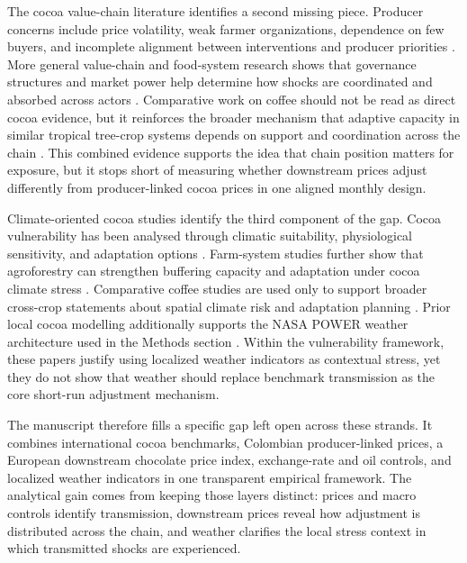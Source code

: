 The cocoa value-chain literature identifies a second missing piece. Producer concerns include price volatility, weak farmer organizations, dependence on few buyers, and incomplete alignment between interventions and producer priorities \citep{Mithofer2017}. More general value-chain and food-system research shows that governance structures and market power help determine how shocks are coordinated and absorbed across actors \citep{Gereffi2005,Merkle2021}. Comparative work on coffee should not be read as direct cocoa evidence, but it reinforces the broader mechanism that adaptive capacity in similar tropical tree-crop systems depends on support and coordination across the chain \citep{Morales2022,Verburg2019}. This combined evidence supports the idea that chain position matters for exposure, but it stops short of measuring whether downstream prices adjust differently from producer-linked cocoa prices in one aligned monthly design.

Climate-oriented cocoa studies identify the third component of the gap. Cocoa vulnerability has been analysed through climatic suitability, physiological sensitivity, and adaptation options \citep{Schroth2016,Laderach2013,Lahive2019}. Farm-system studies further show that agroforestry can strengthen buffering capacity and adaptation under cocoa climate stress \citep{Jacobi2013,Niether2020,Vaast2014}. Comparative coffee studies are used only to support broader cross-crop statements about spatial climate risk and adaptation planning \citep{Koh2020,Laderach2016}. Prior local cocoa modelling additionally supports the NASA POWER weather architecture used in the Methods section \citep{talero_sarmiento_etal_2025}. Within the vulnerability framework, these papers justify using localized weather indicators as contextual stress, yet they do not show that weather should replace benchmark transmission as the core short-run adjustment mechanism.

The manuscript therefore fills a specific gap left open across these strands. It combines international cocoa benchmarks, Colombian producer-linked prices, a European downstream chocolate price index, exchange-rate and oil controls, and localized weather indicators in one transparent empirical framework. The analytical gain comes from keeping those layers distinct: prices and macro controls identify transmission, downstream prices reveal how adjustment is distributed across the chain, and weather clarifies the local stress context in which transmitted shocks are experienced.
